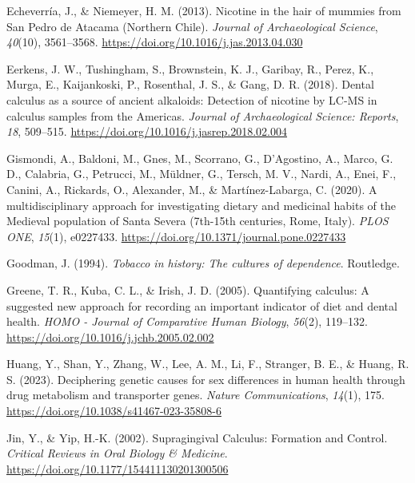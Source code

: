 \documentclass[
  b5paper,
]{book}
\newlength{\cslhangindent}
\newenvironment{CSLReferences}[2] %
 {\begin{list}{}{%
  \setlength{\itemindent}{0pt}
  \setlength{\leftmargin}{0pt}
  \setlength{\parsep}{0pt}
  \ifodd #1
   \setlength{\leftmargin}{\cslhangindent}
   \setlength{\itemindent}{-1\cslhangindent}
  \fi
  \setlength{\itemsep}{#2\baselineskip}}}
 {\end{list}}
\begin{document}
\begin{CSLReferences}{1}{0}
Echeverría, J., \& Niemeyer, H. M. (2013). Nicotine in the hair of
mummies from {San Pedro} de {Atacama} ({Northern Chile}). \emph{Journal
of Archaeological Science}, \emph{40}(10), 3561--3568.
\url{https://doi.org/10.1016/j.jas.2013.04.030}

Eerkens, J. W., Tushingham, S., Brownstein, K. J., Garibay, R., Perez,
K., Murga, E., Kaijankoski, P., Rosenthal, J. S., \& Gang, D. R. (2018).
Dental calculus as a source of ancient alkaloids: {Detection} of
nicotine by {LC-MS} in calculus samples from the {Americas}.
\emph{Journal of Archaeological Science: Reports}, \emph{18}, 509--515.
\url{https://doi.org/10.1016/j.jasrep.2018.02.004}

Gismondi, A., Baldoni, M., Gnes, M., Scorrano, G., D'Agostino, A.,
Marco, G. D., Calabria, G., Petrucci, M., Müldner, G., Tersch, M. V.,
Nardi, A., Enei, F., Canini, A., Rickards, O., Alexander, M., \&
Martínez-Labarga, C. (2020). A multidisciplinary approach for
investigating dietary and medicinal habits of the {Medieval} population
of {Santa Severa} (7th-15th centuries, {Rome}, {Italy}). \emph{PLOS
ONE}, \emph{15}(1), e0227433.
\url{https://doi.org/10.1371/journal.pone.0227433}

Goodman, J. (1994). \emph{Tobacco in history: The cultures of
dependence}. {Routledge}.

Greene, T. R., Kuba, C. L., \& Irish, J. D. (2005). Quantifying
calculus: {A} suggested new approach for recording an important
indicator of diet and dental health. \emph{HOMO - Journal of Comparative
Human Biology}, \emph{56}(2), 119--132.
\url{https://doi.org/10.1016/j.jchb.2005.02.002}

Huang, Y., Shan, Y., Zhang, W., Lee, A. M., Li, F., Stranger, B. E., \&
Huang, R. S. (2023). Deciphering genetic causes for sex differences in
human health through drug metabolism and transporter genes. \emph{Nature
Communications}, \emph{14}(1), 175.
\url{https://doi.org/10.1038/s41467-023-35808-6}

Jin, Y., \& Yip, H.-K. (2002). Supragingival {Calculus}: {Formation} and
{Control}. \emph{Critical Reviews in Oral Biology \& Medicine}.
\url{https://doi.org/10.1177/154411130201300506}


\end{CSLReferences}
\end{document}
